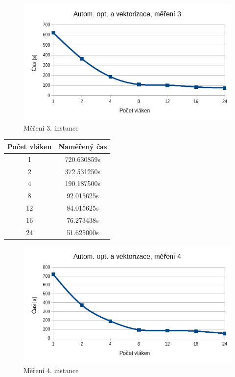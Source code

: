 \documentclass[12pt]{article}
\begin{document}
\begin{figure}[H]
  \begin{center}
     \includegraphics[width=12cm]{images/auto3.png}
    \caption{Měření 3. instance} 
  \end{center}
\end{figure}
%
%
\begin{center}
\begin{tabular}{ c | c }
\textbf{Počet vláken} & \textbf{Naměřený čas} \\ \hline \hline 
1 & 720.630859s \\ \hline
2 & 372.531250s \\ \hline
4 & 190.187500s \\ \hline
8 & 92.015625s \\ \hline
12 & 84.015625s \\ \hline
16 & 76.273438s \\ \hline
24 & 51.625000s \\ \hline
\end{tabular}
\end{center}

\begin{figure}[H]
  \begin{center}
     \includegraphics[width=12cm]{images/auto4.png}
    \caption{Měření 4. instance} 
  \end{center}
\end{figure}
\end{document}
